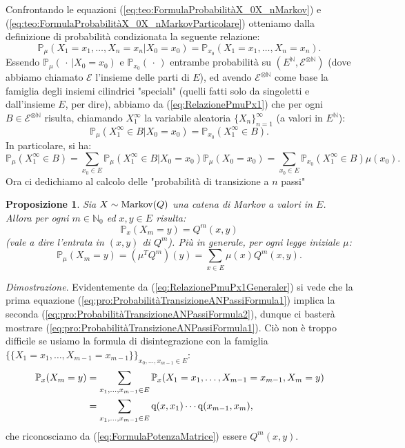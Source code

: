 \documentclass[11pt]{book}
\makeatletter
\theoremstyle{Definizione}
\theoremstyle{TeoremaProposizioneLemmaCorollario}
\newtheorem{mypropo}[myteo]{Proposizione}
\theoremstyle{OsservazioneNota}
\renewenvironment{proof}[1][\proofname]{\par
  \normalfont \topsep6\p@\@plus6\p@\relax
  \trivlist
  \item[\hskip\labelsep
        \itshape
    #1\@addpunct{.}]\ignorespaces
}{%
  \endtrivlist\@endpefalse
}
\newcommand{\N}{\mathbb{N}}
\renewcommand{\P}{\mathbb{P}}
\newcommand{\q}{\textup{q}}
\renewenvironment{proof}{\textsl{Dimostrazione}.}{}
\makeatother
\begin{document}
Confrontando le equazioni (\ref{eq:teo:FormulaProbabilitàX_0X_nMarkov}) e (\ref{eq:teo:FormulaProbabilitàX_0X_nMarkovParticolare}) otteniamo dalla definizione di probabilità condizionata la seguente relazione:
\begin{equation}\label{eq:RelazionePmuPx1}
\P_\mu(X_1 = x_1,\dots,X_n = x_n | X_0 = x_0) = \P_{x_0} (X_1 = x_1,\dots,X_n = x_n).
\end{equation}
Essendo $\P_\mu(\,\cdot\,|X_0 = x_0)$ e $\P_{x_0}(\,\cdot\,)$ entrambe probabilità su $(E^{\N},\mathcal{E}^{\otimes \N})$ (dove abbiamo chiamato $\mathcal{E}$ l'insieme delle parti di $E$), ed avendo $\mathcal{E}^{\otimes\N}$ come base la famiglia degli insiemi cilindrici "speciali" (quelli fatti solo da singoletti e dall'insieme $E$, per dire), abbiamo da (\ref{eq:RelazionePmuPx1}) che per ogni $B\in \mathcal{E}^{\otimes \N}$ risulta, chiamando $X_1^{\infty}$ la variabile aleatoria $\{X_n\}_{n = 1}^\infty$ (a valori in $E^\N$):
\begin{equation}\label{eq:RelazionePmuPx1Generale}
\P_\mu (X_1^{\infty} \in B| X_0 = x_0) = \P_{x_0} (X_1^{\infty}\in B).
\end{equation}
In particolare, si ha:
\begin{equation}\label{eq:RelazionePmuPx1Generaler}
\P_\mu(X_1^{\infty} \in B) = \sum_{x_0\in E} \P_\mu(X_{1}^{\infty}\in B| X_0 = x_0) \P_\mu(X_0 = x_0) = \sum_{x_0\in E} \P_{x_0}(X_1^{\infty}\in B) \mu(x_0).
\end{equation}
Ora ci dedichiamo al calcolo delle "probabilità di transizione a $n$ passi"
\begin{boxpro}
\begin{mypropo}
Sia $X\sim \textup{Markov}(Q)$ una catena di Markov a valori in $E$. Allora per ogni $m\in \N_0$ ed $x,y\in E$ risulta:
\begin{equation}\label{eq:pro:ProbabilitàTransizioneANPassiFormula1}
\P_x(X_m = y) = Q^m(x,y)
\end{equation}
(vale a dire l'entrata in $(x,y)$ di $Q^m$). Più in generale, per ogni legge iniziale $\mu$:
\begin{equation}\label{eq:pro:ProbabilitàTransizioneANPassiFormula2}
\P_\mu(X_m = y) = (\mu^TQ^m)(y) = \sum_{x\in E} \mu(x)Q^m(x,y).
\end{equation}
\end{mypropo}
\tcblower
\begin{proof}
Evidentemente da (\ref{eq:RelazionePmuPx1Generaler}) si vede che la prima equazione (\ref{eq:pro:ProbabilitàTransizioneANPassiFormula1}) implica la seconda (\ref{eq:pro:ProbabilitàTransizioneANPassiFormula2}), dunque ci basterà mostrare (\ref{eq:pro:ProbabilitàTransizioneANPassiFormula1}). Ciò non è troppo difficile se usiamo la formula di disintegrazione con la famiglia $\{\{X_1 = x_1,\dots,X_{m-1} = x_{m-1}\}\}_{x_0,\dots,x_{m-1}\in E}$:
\begin{align*}
\P_x(X_m = y) &= \sum_{x_1,\dots,x_{m-1}\in E} \P_x(X_1 = x_1,\dots,X_{m-1} = x_{m-1},X_m = y)\\
&= \sum_{x_1,\dots,x_{m-1}\in E} \q(x,x_1)\cdots \q(x_{m-1},x_m),
\end{align*}
che riconosciamo da (\ref{eq:FormulaPotenzaMatrice}) essere $Q^m(x,y)$.
\end{proof}
\end{boxpro}
\end{document}
